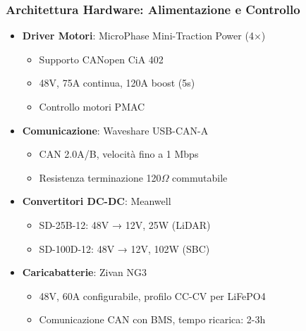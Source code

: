 \begin{frame}
    \frametitle{Architettura Hardware: Alimentazione e Controllo}
    \begin{itemize}
        \item \textbf{Driver Motori}: MicroPhase Mini-Traction Power (4×)
              \begin{itemize}
                  \item Supporto CANopen CiA 402
                  \item 48V, 75A continua, 120A boost (5s)
                  \item Controllo motori PMAC
              \end{itemize}
        \item \textbf{Comunicazione}: Waveshare USB-CAN-A
              \begin{itemize}
                  \item CAN 2.0A/B, velocità fino a 1 Mbps
                  \item Resistenza terminazione 120$\Omega$ commutabile
              \end{itemize}
        \item \textbf{Convertitori DC-DC}: Meanwell
              \begin{itemize}
                  \item SD-25B-12: 48V → 12V, 25W (LiDAR)
                  \item SD-100D-12: 48V → 12V, 102W (SBC)
              \end{itemize}
        \item \textbf{Caricabatterie}: Zivan NG3
              \begin{itemize}
                  \item 48V, 60A configurabile, profilo CC-CV per LiFePO4
                  \item Comunicazione CAN con BMS, tempo ricarica: 2-3h
              \end{itemize}
    \end{itemize}
\end{frame}

